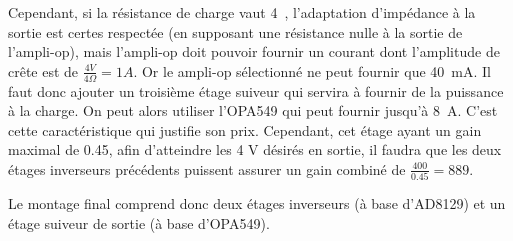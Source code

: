 \documentclass{../../template/tp}
\begin{document}
{\begin{enumerate}
        Cependant, si la résistance de charge vaut 4~\ohm, l'adaptation d'impédance à la sortie est certes respectée (en supposant une résistance nulle à la sortie de l'ampli-op), mais l'ampli-op doit pouvoir fournir un courant dont l'amplitude de crête est de $\frac{4V}{4\Omega} = 1 A$.
        Or le ampli-op sélectionné ne peut fournir que 40~mA.
        Il faut donc ajouter un troisième étage suiveur qui servira à fournir de la puissance à la charge.
        On peut alors utiliser l'OPA549 qui peut fournir jusqu'à 8~A.
        C'est cette caractéristique qui justifie son prix.
        Cependant, cet étage ayant un gain maximal de 0.45, afin d'atteindre les 4 V désirés en sortie, il faudra que les deux étages inverseurs précédents puissent assurer un gain combiné de $\frac{400}{0.45} = 889$.

        Le montage final comprend donc deux étages inverseurs (à base d'AD8129) et un étage suiveur de sortie (à base d'OPA549).
    \end{enumerate}
}
\end{document}
